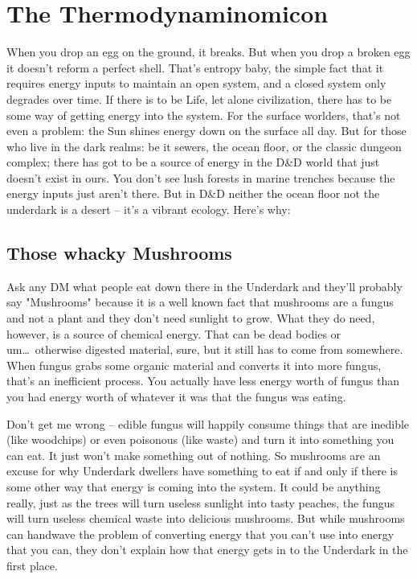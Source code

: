 \section{The Thermodynaminomicon} %
\vspace*{-10pt}

When you drop an egg on the ground, it breaks. But when you drop a broken egg it doesn't reform a perfect shell. That's entropy baby, the simple fact that it requires energy inputs to maintain an open system, and a closed system only degrades over time. If there is to be Life, let alone civilization, there has to be some way of getting energy into the system. For the surface worlders, that's not even a problem: the Sun shines energy down on the surface all day. But for those who live in the dark realms: be it sewers, the ocean floor, or the classic dungeon complex; there has got to be a source of energy in the D\&D world that just doesn't exist in ours. You don't see lush forests in marine trenches because the energy inputs just aren't there. But in D\&D neither the ocean floor not the underdark is a desert -- it's a vibrant ecology. Here's why:

\subsection{Those whacky Mushrooms}

Ask any DM what people eat down there in the Underdark and they'll probably say "Mushrooms" because it is a well known fact that mushrooms are a fungus and not a plant and they don't need sunlight to grow. What they do need, however, is a source of chemical energy. That can be dead bodies or um\ldots\  otherwise digested material, sure, but it still has to come from somewhere. When fungus grabs some organic material and converts it into more fungus, that's an inefficient process. You actually have less energy worth of fungus than you had energy worth of whatever it was that the fungus was eating.

Don't get me wrong -- edible fungus will happily consume things that are inedible (like woodchips) or even poisonous (like waste) and turn it into something you can eat. It just won't make something out of nothing. So mushrooms are an excuse for why Underdark dwellers have something to eat if and only if there is some other way that energy is coming into the system. It could be anything really, just as the trees will turn useless sunlight into tasty peaches, the fungus will turn useless chemical waste into delicious mushrooms. But while mushrooms can handwave the problem of converting energy that you can't use into energy that you can, they don't explain how that energy gets in to the Underdark in the first place.

